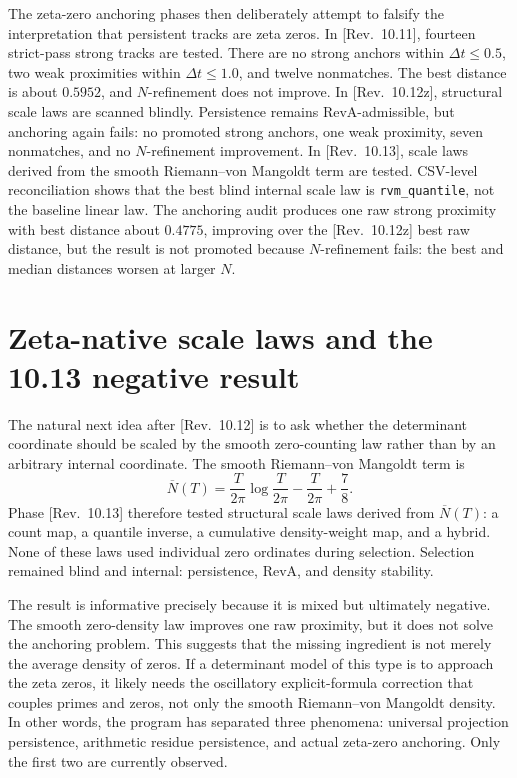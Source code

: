 \documentclass[11pt]{article}
\newcommand{\revtag}[1]{\textnormal{[Rev.~#1]}}
\theoremstyle{definition}
\theoremstyle{plain}
\begin{document}
The zeta-zero anchoring phases then deliberately attempt to falsify the interpretation that persistent tracks are zeta zeros.  In \revtag{10.11}, fourteen strict-pass strong tracks are tested.  There are no strong anchors within $\Delta t\le 0.5$, two weak proximities within $\Delta t\le 1.0$, and twelve nonmatches.  The best distance is about $0.5952$, and $N$-refinement does not improve.  In \revtag{10.12z}, structural scale laws are scanned blindly.  Persistence remains RevA-admissible, but anchoring again fails: no promoted strong anchors, one weak proximity, seven nonmatches, and no $N$-refinement improvement.  In \revtag{10.13}, scale laws derived from the smooth Riemann--von Mangoldt term are tested.  CSV-level reconciliation shows that the best blind internal scale law is \texttt{rvm\_quantile}, not the baseline linear law.  The anchoring audit produces one raw strong proximity with best distance about $0.4775$, improving over the \revtag{10.12z} best raw distance, but the result is not promoted because $N$-refinement fails: the best and median distances worsen at larger $N$.

\section{Zeta-native scale laws and the 10.13 negative result}

The natural next idea after \revtag{10.12} is to ask whether the determinant coordinate should be scaled by the smooth zero-counting law rather than by an arbitrary internal coordinate.  The smooth Riemann--von Mangoldt term is
\begin{equation}
  \overline N(T)=\frac{T}{2\pi}\log\frac{T}{2\pi}-\frac{T}{2\pi}+\frac78.
\end{equation}
Phase \revtag{10.13} therefore tested structural scale laws derived from $\overline N(T)$: a count map, a quantile inverse, a cumulative density-weight map, and a hybrid.  None of these laws used individual zero ordinates during selection.  Selection remained blind and internal: persistence, RevA, and density stability.

The result is informative precisely because it is mixed but ultimately negative.  The smooth zero-density law improves one raw proximity, but it does not solve the anchoring problem.  This suggests that the missing ingredient is not merely the average density of zeros.  If a determinant model of this type is to approach the zeta zeros, it likely needs the oscillatory explicit-formula correction that couples primes and zeros, not only the smooth Riemann--von Mangoldt density.  In other words, the program has separated three phenomena: universal projection persistence, arithmetic residue persistence, and actual zeta-zero anchoring.  Only the first two are currently observed.
\end{document}
